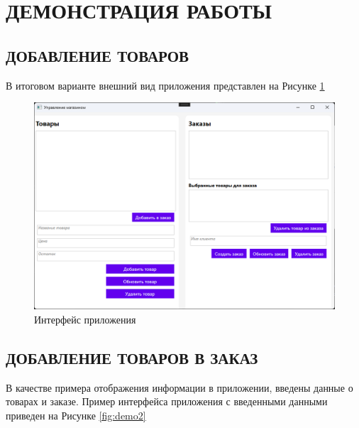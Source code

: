 \documentclass[12pt]{article}
\numberwithin{listing}{section}
\numberwithin{figure}{section}
\begin{document}
\pagebreak

\section{ДЕМОНСТРАЦИЯ РАБОТЫ \ \texorpdfstring{\faGlasses}{}}

\subsection{ДОБАВЛЕНИЕ ТОВАРОВ}

В итоговом варианте внешний вид приложения представлен на Рисунке \ref{fig:demo1}

\begin{figure}[ht]
	\centering
	\includegraphics[width=1.0\textwidth]{fig/image 26.png}
	\caption{Интерфейс приложения}
	\label{fig:demo1}
\end{figure}

\pagebreak


\subsection{ДОБАВЛЕНИЕ ТОВАРОВ В ЗАКАЗ}

В качестве примера отображения информации в приложении, введены данные о товарах и заказе. Пример интерфейса приложения с введенными данными приведен на Рисунке \ref{fig:demo2}
\end{document}
